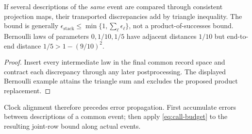 \begin{proposition}\label{p2-20}
If several descriptions of the \emph{same} event are compared through consistent projection maps, their transported discrepancies add by triangle inequality. The bound is generally
\(\epsilon_{\mathrm{stack}}\le\min\{1,\sum_\ell\epsilon_\ell\}\), not a product-of-successes bound. Bernoulli laws of parameters \(0,1/10,1/5\) have adjacent distances \(1/10\) but end-to-end distance \(1/5>1-(9/10)^2\).
\end{proposition}
\begin{proof}
Insert every intermediate law in the final common record space and contract each discrepancy through any later postprocessing. The displayed Bernoulli example attains the triangle sum and excludes the proposed product replacement.
\end{proof}
Clock alignment therefore precedes error propagation. First accumulate errors between descriptions of a common event; then apply \cref{eq:call-budget} to the resulting joint-row bound along actual events.

